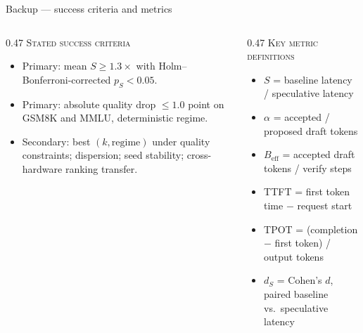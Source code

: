 \documentclass[aspectratio=169, 11pt]{beamer}
\begin{document}
\begin{frame}{Backup --- success criteria and metrics}
  \begin{columns}[T,onlytextwidth]
    \begin{column}{0.47\textwidth}
      {\footnotesize\color{ink2}\textsc{Stated success criteria}}\par
      \vskip5pt
      \begin{itemize}\itemsep4pt\small
        \item Primary: mean $S \ge 1.3\times$ with Holm--Bonferroni-corrected
              $p_S < 0.05$.
        \item Primary: absolute quality drop $\le 1.0$ point on GSM8K and
              MMLU, deterministic regime.
        \item Secondary: best $(k, \text{regime})$ under quality constraints;
              dispersion; seed stability; cross-hardware ranking transfer.
      \end{itemize}
    \end{column}
    \begin{column}{0.47\textwidth}
      {\footnotesize\color{ink2}\textsc{Key metric definitions}}\par
      \vskip5pt
      \begin{itemize}\itemsep4pt\small
        \item $S$ = baseline latency / speculative latency
        \item $\alpha$ = accepted / proposed draft tokens
        \item $B_{\text{eff}}$ = accepted draft tokens / verify steps
        \item TTFT = first token time $-$ request start
        \item TPOT = (completion $-$ first token) / output tokens
        \item $d_S$ = Cohen's $d$, paired baseline vs.\ speculative latency
      \end{itemize}
    \end{column}
  \end{columns}
\end{frame}
\end{document}
